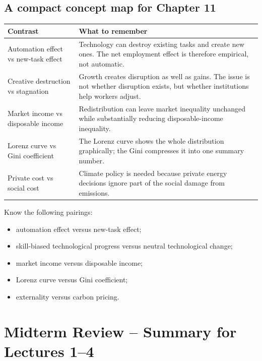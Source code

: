 \documentclass[12pt]{article}
\begin{document}
\subsection{A compact concept map for Chapter 11}

\begin{center}
\renewcommand{\arraystretch}{1.2}
\begin{tabularx}{\textwidth}{|p{3.0cm}|X|}
\hline
\textbf{Contrast} & \textbf{What to remember} \\
\hline
Automation effect vs new-task effect & Technology can destroy existing tasks and create new ones. The net employment effect is therefore empirical, not automatic. \\
\hline
Creative destruction vs stagnation & Growth creates disruption as well as gains. The issue is not whether disruption exists, but whether institutions help workers adjust. \\
\hline
Market income vs disposable income & Redistribution can leave market inequality unchanged while substantially reducing disposable-income inequality. \\
\hline
Lorenz curve vs Gini coefficient & The Lorenz curve shows the whole distribution graphically; the Gini compresses it into one summary number. \\
\hline
Private cost vs social cost & Climate policy is needed because private energy decisions ignore part of the social damage from emissions. \\
\hline
\end{tabularx}
\end{center}

\begin{examtip}[title={Exam Focus: Chapter 11 recognition checklist}]
Know the following pairings:
\begin{itemize}[leftmargin=1.5em]
\item automation effect versus new-task effect;
\item skill-biased technological progress versus neutral technological change;
\item market income versus disposable income;
\item Lorenz curve versus Gini coefficient;
\item externality versus carbon pricing.
\end{itemize}
\end{examtip}

\newpage
\section{Midterm Review -- Summary for Lectures 1--4}
\end{document}
